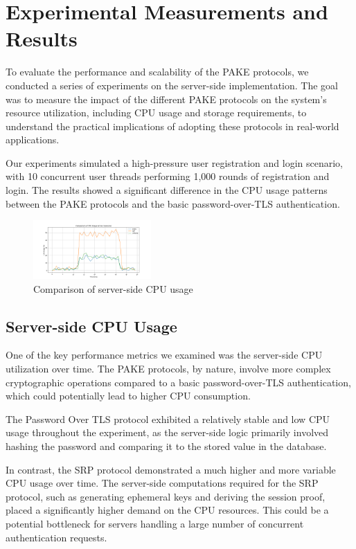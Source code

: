 \section{Experimental Measurements and Results}
\label{sec:exp_results}

To evaluate the performance and scalability of the PAKE protocols, we conducted a series of experiments on the server-side implementation. The goal was to measure the impact of the different PAKE protocols on the system's resource utilization, including CPU usage and storage requirements, to understand the practical implications of adopting these protocols in real-world applications.

Our experiments simulated a high-pressure user registration and login scenario, with 10 concurrent user threads performing 1,000 rounds of registration and login. The results showed a significant difference in the CPU usage patterns between the PAKE protocols and the basic password-over-TLS authentication.

\begin{figure}[ht]
  \centering
  \includegraphics[width=0.4\textwidth]{./images/cpu_usage_comparison.png}
  \caption{Comparison of server-side CPU usage}
  \label{fig:cpu_usage}
\end{figure}

\subsection{Server-side CPU Usage}

One of the key performance metrics we examined was the server-side CPU utilization over time. The PAKE protocols, by nature, involve more complex cryptographic operations compared to a basic password-over-TLS authentication, which could potentially lead to higher CPU consumption.

The Password Over TLS protocol exhibited a relatively stable and low CPU usage throughout the experiment, as the server-side logic primarily involved hashing the password and comparing it to the stored value in the database.

In contrast, the SRP protocol demonstrated a much higher and more variable CPU usage over time. The server-side computations required for the SRP protocol, such as generating ephemeral keys and deriving the session proof, placed a significantly higher demand on the CPU resources. This could be a potential bottleneck for servers handling a large number of concurrent authentication requests.

